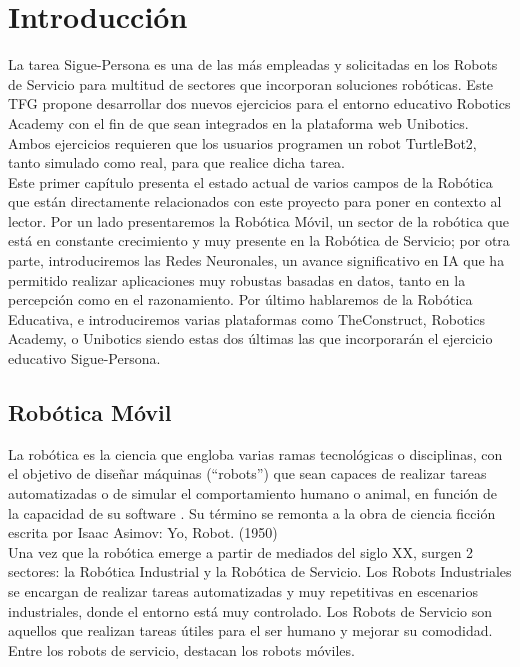 \chapter{Introducción}
\label{cap:capitulo1}
\setcounter{page}{1}
\pagestyle{plain}

La tarea Sigue-Persona es una de las más empleadas y solicitadas en los Robots de Servicio para multitud de sectores que incorporan soluciones robóticas. Este TFG propone desarrollar dos nuevos ejercicios para el entorno educativo Robotics Academy con el fin de que sean integrados en la plataforma web Unibotics. Ambos ejercicios requieren que los usuarios programen un robot TurtleBot2, tanto simulado como real, para que realice dicha tarea.\\

Este primer capítulo presenta el estado actual de varios campos de la Robótica que están directamente relacionados con este proyecto para poner en contexto al lector. Por un lado presentaremos la Robótica Móvil, un sector de la robótica que está en constante crecimiento y muy presente en la Robótica de Servicio; por otra parte, introduciremos las Redes Neuronales, un avance significativo en IA que ha permitido realizar aplicaciones muy robustas basadas en datos, tanto en la percepción como en el razonamiento. Por último hablaremos de la Robótica Educativa, e introduciremos varias plataformas como TheConstruct, Robotics Academy, o Unibotics siendo estas dos últimas las que incorporarán el ejercicio educativo Sigue-Persona.




\section{Robótica Móvil}
\label{sec:robotica_movil}

La robótica es la ciencia que engloba varias ramas tecnológicas o disciplinas, con el objetivo de diseñar máquinas (``robots'') que sean capaces de realizar tareas automatizadas o de simular el comportamiento humano o animal, en función de la capacidad de su software \cite{revistaderobots}. Su término se remonta a la obra de ciencia ficción escrita por Isaac Asimov: Yo, Robot. (1950)\\

Una vez que la robótica emerge a partir de mediados del siglo XX, surgen 2 sectores: la Robótica Industrial y la Robótica de Servicio. Los Robots Industriales se encargan de realizar tareas automatizadas y muy repetitivas en escenarios industriales, donde el entorno está muy controlado. Los Robots de Servicio son aquellos que realizan tareas útiles para el ser humano y mejorar su comodidad. Entre los robots de servicio, destacan los robots móviles.\\

